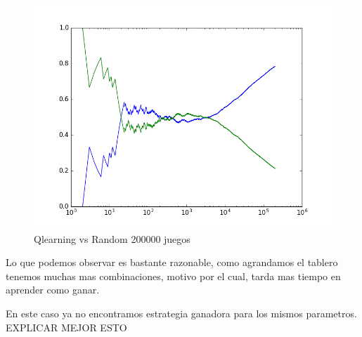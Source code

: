 \begin{figure}[h]
 \centering
  \begin{minipage}[c]{1\textwidth}
	\centering	
	\includegraphics[scale=0.5]{img/QlearningRandomEgreedy2000007x6(4).png}
        \caption{Qlearning vs Random 200000 juegos}
  \end{minipage}
\end{figure}

Lo que podemos observar es bastante razonable, como agrandamos el tablero tenemos muchas mas combinaciones, motivo por el cual, tarda mas tiempo en aprender como ganar. 

En este caso ya no encontramos estrategia ganadora para los mismos parametros.
{\huge EXPLICAR MEJOR ESTO}\\


